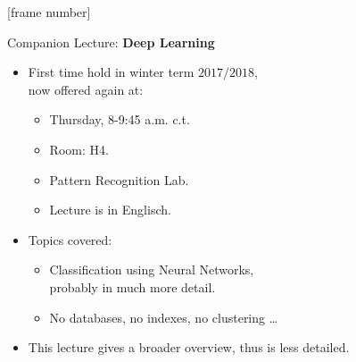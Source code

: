\documentclass[aspectratio=169,t]{beamer}
\begin{document}
{ %
	[frame number]
	\begin{frame}{Companion Lecture: \textbf{Deep Learning}}
		\begin{itemize}
			\item First time hold in winter term $2017/2018$,\\
			      now offered again at:
			      \begin{itemize}
				      \item Thursday, 8-9:45 a.m. c.t.
				      \item Room: H4.
				      \item Pattern Recognition Lab.
				      \item Lecture is in Englisch.
			      \end{itemize}
			\item Topics covered:
			      \begin{itemize}
				      \item Classification using Neural Networks, \\
				            probably in much more detail.
				      \item No databases, no indexes, no clustering \ldots
			      \end{itemize}
			\item This lecture gives a broader overview, thus is less detailed.
		\end{itemize}
	\end{frame}
}
\end{document}
